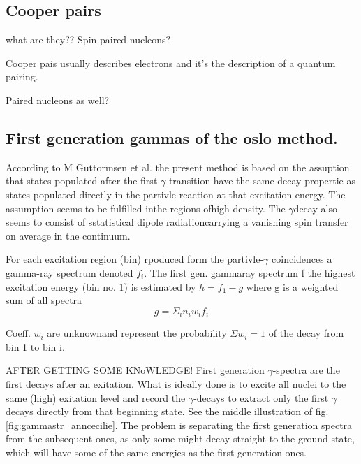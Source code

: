 \documentclass[%
 reprint,
 amsmath,amssymb,
 aps,
 norsk
]{revtex4-1}
\begin{document}
\subsection{Cooper pairs}

what are they?? Spin paired nucleons?

Cooper pais usually describes electrons and it's the description of a quantum pairing. 

Paired nucleons as well?







\subsection{First generation gammas of the oslo method.}
According to M Guttormsen et al. \cite{guttormsen_firstgenerationgamma} the present method is based on the assuption that states populated after the first $\gamma$-transition have the same decay propertie as states populated directly in the partivle reaction at that excitation energy. The assumption seems to be fulfilled inthe regions ofhigh density. The $\gamma$decay also seems to consist of sstatistical dipole radiationcarrying a vanishing spin transfer on average in the continuum.

For each excitation region (bin) rpoduced form the partivle-$\gamma$ coincidences a gamma-ray spectrum denoted $f_i$. The first gen.  gammaray spectrum f the highest excitation energy (bin no. 1) is estimated by $h = f_1 - g$ where g is a weighted sum of all spectra
\begin{equation}
g = \Sigma_i n_i w_i f_i
\end{equation}

Coeff. $w_i$ are unknownand represent the probability $\Sigma w_i = 1$ of the decay from bin 1 to bin i.



AFTER GETTING SOME KNoWLEDGE! 
First generation $\gamma$-spectra are the first decays after an exitation. What is ideally done is to excite all nuclei to the same (high) exitation level and record the $\gamma$-decays to extract only the first $\gamma$ decays directly from that beginning state. See the middle illustration of fig. \ref{fig:gammastr_anncecilie}. The problem is separating the first generation spectra from the subsequent ones, as only some might decay straight to the ground state, which will have some of the same energies as the first generation ones.
\end{document}
